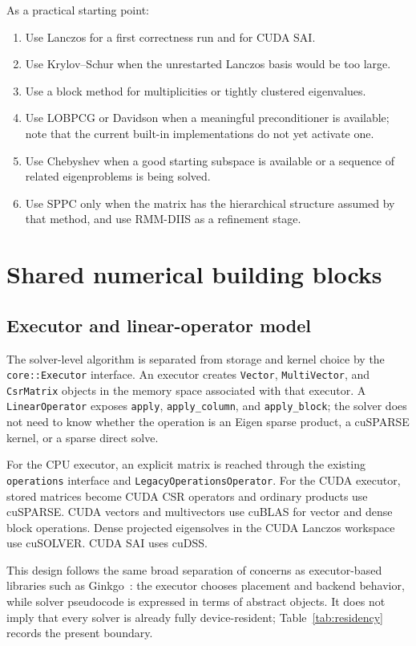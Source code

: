 \documentclass[11pt]{article}
\newcommand{\code}[1]{\texttt{#1}}
\begin{document}
As a practical starting point:
\begin{enumerate}[leftmargin=*]
  \item Use Lanczos for a first correctness run and for CUDA SAI.
  \item Use Krylov--Schur when the unrestarted Lanczos basis would be too large.
  \item Use a block method for multiplicities or tightly clustered eigenvalues.
  \item Use LOBPCG or Davidson when a meaningful preconditioner is available;
        note that the current built-in implementations do not yet activate one.
  \item Use Chebyshev when a good starting subspace is available or a sequence
        of related eigenproblems is being solved.
  \item Use SPPC only when the matrix has the hierarchical structure assumed by
        that method, and use RMM-DIIS as a refinement stage.
\end{enumerate}

\section{Shared numerical building blocks}

\subsection{Executor and linear-operator model}

The solver-level algorithm is separated from storage and kernel choice by the
\code{core::Executor} interface.  An executor creates \code{Vector},
\code{MultiVector}, and \code{CsrMatrix} objects in the memory space associated
with that executor.  A \code{LinearOperator} exposes
\code{apply}, \code{apply\_column}, and \code{apply\_block}; the solver does not
need to know whether the operation is an Eigen sparse product, a cuSPARSE
kernel, or a sparse direct solve.

For the CPU executor, an explicit matrix is reached through the existing
\code{operations} interface and \code{LegacyOperationsOperator}.  For the CUDA
executor, stored matrices become CUDA CSR operators and ordinary products use
cuSPARSE.  CUDA vectors and multivectors use cuBLAS for vector and dense block
operations.  Dense projected eigensolves in the CUDA Lanczos workspace use
cuSOLVER.  CUDA SAI uses cuDSS.

This design follows the same broad separation of concerns as executor-based
libraries such as Ginkgo~\cite{ginkgo}: the executor chooses placement and
backend behavior, while solver pseudocode is expressed in terms of abstract
objects.  It does not imply that every solver is already fully device-resident;
Table~\ref{tab:residency} records the present boundary.
\end{document}
